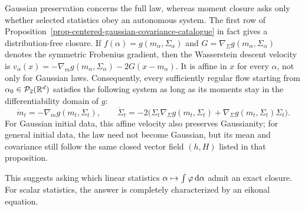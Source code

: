 Gaussian preservation concerns the full law, whereas moment closure asks only whether selected statistics obey an autonomous system. The first row of Proposition~\ref{prop-centered-gaussian-covariance-catalogue} in fact gives a distribution-free closure. If $f(\alpha)=g(m_\alpha,\Sigma_\alpha)$ and $G=\nabla_\Sigma g(m_\alpha,\Sigma_\alpha)$ denotes the symmetric Frobenius gradient, then the Wasserstein descent velocity is
\(v_\alpha(x)=-\nabla_m g(m_\alpha,\Sigma_\alpha)-2G(x-m_\alpha)\).
It is affine in $x$ for every $\alpha$, not only for Gaussian laws. Consequently, every sufficiently regular flow starting from $\alpha_0\in\mathcal{P}_2(\mathbb{R}^d)$ satisfies the following system as long as its moments stay in the differentiability domain of $g$:
\begin{equation}\label{eq-distribution-free-mean-covariance-closure}
	\dot m_t=-\nabla_m g(m_t,\Sigma_t),
	\qquad
	\dot\Sigma_t
	=
	-2\bigl(\Sigma_t\nabla_\Sigma g(m_t,\Sigma_t)
	+\nabla_\Sigma g(m_t,\Sigma_t)\Sigma_t\bigr).
\end{equation}
For Gaussian initial data, this affine velocity also preserves Gaussianity; for general initial data, the law need not become Gaussian, but its mean and covariance still follow the same closed vector field $(h,H)$ listed in that proposition.

This suggests asking which linear statistics $\alpha\mapsto\int\varphi\,\mathrm{d}\alpha$ admit an exact closure. For scalar statistics, the answer is completely characterized by an eikonal equation.


